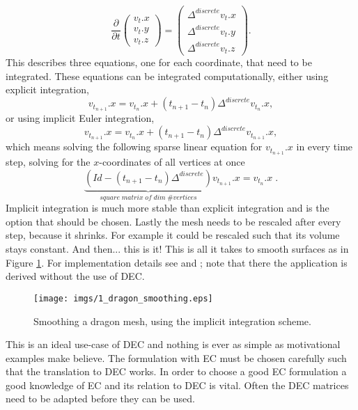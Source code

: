 \[\frac{\partial}{\partial t} \begin{pmatrix}
v_t.x \\
v_t.y\\ 
v_t.z
\end{pmatrix} = \begin{pmatrix}
\Delta^{discrete} v_t.x \\
\Delta^{discrete} v_t.y \\
\Delta^{discrete} v_t.z
\end{pmatrix}.\]
This describes three equations, one for each coordinate, that need to be integrated. These equations can be integrated computationally, either using explicit integration,
\[v_{t_{n+1}}.x = v_{t_n}.x + (t_{n+1}-t_n) \Delta^{discrete} v_{t_n}.x,\]
or using implicit Euler integration,
\[v_{t_{n+1}}.x = v_{t_n}.x + (t_{n+1}-t_n) \Delta^{discrete} v_{t_{n+1}}.x,\]
which means solving the following sparse linear equation for $v_{t_{n+1}}.x $ in every time step, solving for the $x$-coordinates of all vertices at once
\[\underbrace{(Id - (t_{n+1}-t_n) \Delta^{discrete})}_{square\; matrix\; of \; dim \; \# vertices} v_{t_{n+1}}.x = v_{t_n}.x\;.\]
Implicit integration is much more stable than explicit integration and is the option that should be chosen. Lastly the mesh needs to be rescaled after every step, because it shrinks. For example it could be rescaled such that its volume stays constant. And then... this is it! This is all it takes to smooth surfaces as in Figure \ref{fig:1_dragonsmoothing}.  For implementation details see \cite{Desbrun:1999:IFI:311535.311576} and \cite{laplacebeltrami}; note that there the application is derived without the use of DEC.

\begin{figure}%
\texttt{[image: imgs/1\_dragon\_smoothing.eps]}%
\caption{Smoothing a dragon mesh, using the implicit integration scheme.}%
\label{fig:1_dragonsmoothing}%
\end{figure}

This is an ideal use-case of DEC and nothing is ever as simple as motivational examples make believe. The formulation with EC must be chosen carefully such that the translation to DEC works. In order to choose a good EC formulation a good knowledge of EC and its relation to DEC is vital. Often the DEC matrices need to be adapted before they can be used. %


